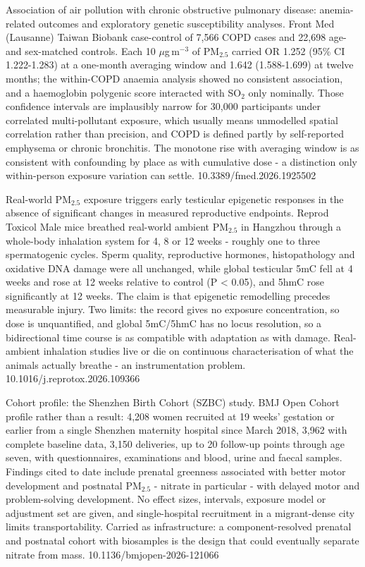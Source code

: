 \documentclass[10pt]{article}
\begin{document}

{Association of air pollution with chronic obstructive pulmonary disease: anemia-related outcomes and exploratory genetic susceptibility analyses.}
{Front Med (Lausanne)}
{Taiwan Biobank case-control of 7,566 COPD cases and 22,698 age- and sex-matched controls. Each 10 $\mu$g\,m$^{-3}$ of PM$_{2.5}$ carried OR 1.252 (95\% CI 1.222-1.283) at a one-month averaging window and 1.642 (1.588-1.699) at twelve months; the within-COPD anaemia analysis showed no consistent association, and a haemoglobin polygenic score interacted with SO$_2$ only nominally. Those confidence intervals are implausibly narrow for 30,000 participants under correlated multi-pollutant exposure, which usually means unmodelled spatial correlation rather than precision, and COPD is defined partly by self-reported emphysema or chronic bronchitis. The monotone rise with averaging window is as consistent with confounding by place as with cumulative dose - a distinction only within-person exposure variation can settle.}
{10.3389/fmed.2026.1925502}


{Real-world PM$_{2.5}$ exposure triggers early testicular epigenetic responses in the absence of significant changes in measured reproductive endpoints.}
{Reprod Toxicol}
{Male mice breathed real-world ambient PM$_{2.5}$ in Hangzhou through a whole-body inhalation system for 4, 8 or 12 weeks - roughly one to three spermatogenic cycles. Sperm quality, reproductive hormones, histopathology and oxidative DNA damage were all unchanged, while global testicular 5mC fell at 4 weeks and rose at 12 weeks relative to control (P < 0.05), and 5hmC rose significantly at 12 weeks. The claim is that epigenetic remodelling precedes measurable injury. Two limits: the record gives no exposure concentration, so dose is unquantified, and global 5mC/5hmC has no locus resolution, so a bidirectional time course is as compatible with adaptation as with damage. Real-ambient inhalation studies live or die on continuous characterisation of what the animals actually breathe - an instrumentation problem.}
{10.1016/j.reprotox.2026.109366}

{Cohort profile: the Shenzhen Birth Cohort (SZBC) study.}
{BMJ Open}
{Cohort profile rather than a result: 4,208 women recruited at 19 weeks' gestation or earlier from a single Shenzhen maternity hospital since March 2018, 3,962 with complete baseline data, 3,150 deliveries, up to 20 follow-up points through age seven, with questionnaires, examinations and blood, urine and faecal samples. Findings cited to date include prenatal greenness associated with better motor development and postnatal PM$_{2.5}$ - nitrate in particular - with delayed motor and problem-solving development. No effect sizes, intervals, exposure model or adjustment set are given, and single-hospital recruitment in a migrant-dense city limits transportability. Carried as infrastructure: a component-resolved prenatal and postnatal cohort with biosamples is the design that could eventually separate nitrate from mass.}
{10.1136/bmjopen-2026-121066}
\end{document}

